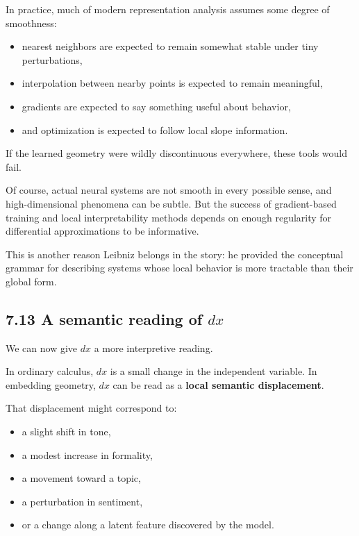 In practice, much of modern representation analysis assumes some degree
of smoothness:

\begin{itemize}
\tightlist
\item
  nearest neighbors are expected to remain somewhat stable under tiny
  perturbations,
\item
  interpolation between nearby points is expected to remain meaningful,
\item
  gradients are expected to say something useful about behavior,
\item
  and optimization is expected to follow local slope information.
\end{itemize}

If the learned geometry were wildly discontinuous everywhere, these
tools would fail.

Of course, actual neural systems are not smooth in every possible sense,
and high-dimensional phenomena can be subtle. But the success of
gradient-based training and local interpretability methods depends on
enough regularity for differential approximations to be informative.

This is another reason Leibniz belongs in the story: he provided the
conceptual grammar for describing systems whose local behavior is more
tractable than their global form.

\hypertarget{a-semantic-reading-of-dx}{%
\subsection{\texorpdfstring{7.13 A semantic reading of
\(dx\)}{7.13 A semantic reading of dx}}\label{a-semantic-reading-of-dx}}

We can now give \(dx\) a more interpretive reading.

In ordinary calculus, \(dx\) is a small change in the independent
variable. In embedding geometry, \(dx\) can be read as a \textbf{local
semantic displacement}.

That displacement might correspond to:

\begin{itemize}
\tightlist
\item
  a slight shift in tone,
\item
  a modest increase in formality,
\item
  a movement toward a topic,
\item
  a perturbation in sentiment,
\item
  or a change along a latent feature discovered by the model.
\end{itemize}

